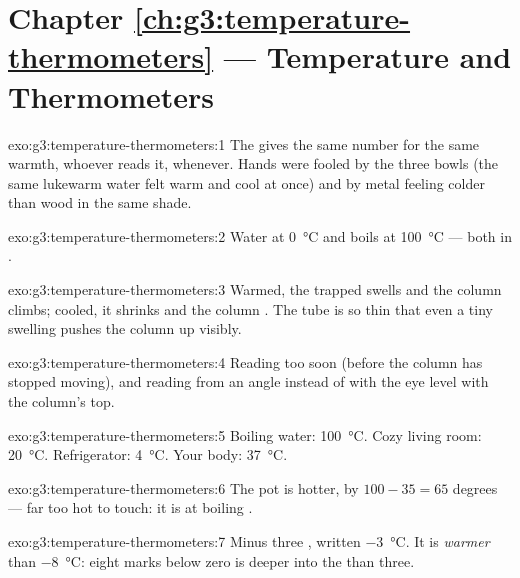\section*{Chapter \ref{ch:g3:temperature-thermometers} --- Temperature and Thermometers}

\begin{solution}{exo:g3:temperature-thermometers:1}
The  gives the same number for the same warmth, whoever
reads it, whenever. Hands were fooled by the three bowls (the same
lukewarm water felt warm and cool at once) and by metal feeling
colder than wood in the same shade.
\end{solution}

\begin{solution}{exo:g3:temperature-thermometers:2}
Water  at \qty{0}{\celsius} and boils at \qty{100}{\celsius}
--- both in .
\end{solution}

\begin{solution}{exo:g3:temperature-thermometers:3}
Warmed, the trapped  swells and the column climbs; cooled, it
shrinks and the column . The tube is so thin that even a tiny
swelling pushes the column up visibly.
\end{solution}

\begin{solution}{exo:g3:temperature-thermometers:4}
Reading too soon (before the column has stopped moving), and reading
from an angle instead of with the eye level with the column's top.
\end{solution}

\begin{solution}{exo:g3:temperature-thermometers:5}
Boiling water: \qty{100}{\celsius}. Cozy living room:
\qty{20}{\celsius}. Refrigerator: \qty{4}{\celsius}. Your body:
\qty{37}{\celsius}.
\end{solution}

\begin{solution}{exo:g3:temperature-thermometers:6}
The pot is hotter, by $100 - 35 = 65$ degrees --- far too hot to
touch: it is at boiling .
\end{solution}

\begin{solution}{exo:g3:temperature-thermometers:7}
Minus three , written \qty{-3}{\celsius}. It is
\emph{warmer} than \qty{-8}{\celsius}: eight marks below zero is
deeper into the  than three.
\end{solution}

